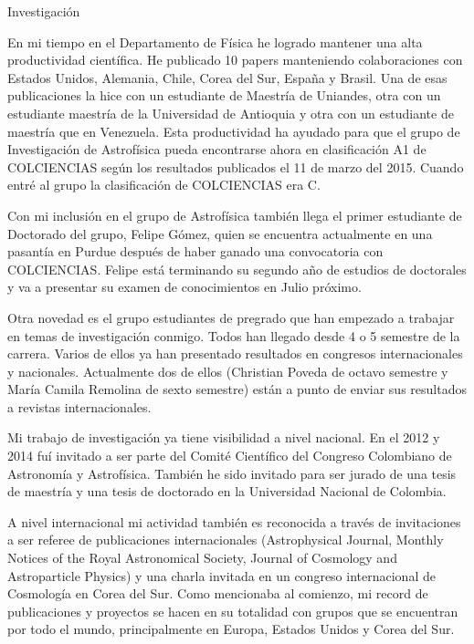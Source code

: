 Investigación

En mi tiempo en el Departamento de Física he logrado mantener una alta productividad científica. He publicado 10 papers manteniendo colaboraciones con Estados Unidos, Alemania, Chile, Corea del Sur, España y Brasil. Una de esas publicaciones la hice con un estudiante de Maestría de Uniandes, otra con un estudiante maestría de la Universidad de Antioquia y otra con un estudiante de maestría que en Venezuela. Esta productividad ha ayudado para que el grupo de Investigación de Astrofísica pueda encontrarse ahora en clasificación A1 de COLCIENCIAS según los resultados publicados el 11 de marzo del 2015. Cuando entré al grupo la clasificación de COLCIENCIAS era C. 

Con mi inclusión en el grupo de Astrofísica también llega el primer estudiante de Doctorado del grupo, Felipe Gómez, quien se encuentra actualmente en una pasantía en Purdue después de haber ganado una convocatoria con COLCIENCIAS. Felipe está terminando su segundo año de estudios de doctorales y va a presentar su examen de conocimientos en Julio próximo.

Otra novedad es el grupo estudiantes de pregrado que han empezado a trabajar en temas de investigación conmigo. Todos han llegado desde 4 o 5 semestre de la carrera. Varios de ellos ya han presentado resultados en congresos internacionales y nacionales. Actualmente dos de ellos (Christian Poveda de octavo semestre y María Camila Remolina de sexto semestre) están a punto de enviar sus resultados a revistas internacionales. 

Mi trabajo de investigación ya tiene visibilidad a nivel nacional. En el 2012 y 2014 fuí invitado a ser parte del Comité Científico del Congreso Colombiano de Astronomía y Astrofísica. También he sido invitado para ser jurado de una tesis de maestría y una tesis de doctorado en la Universidad Nacional de Colombia. 

A nivel internacional mi actividad también es reconocida a través de invitaciones a ser referee de publicaciones internacionales (Astrophysical Journal, Monthly Notices of the Royal Astronomical Society, Journal of Cosmology and Astroparticle Physics) y una charla invitada en un congreso internacional de Cosmología en Corea del Sur. Como mencionaba al comienzo, mi record de publicaciones y proyectos se hacen en su totalidad con grupos que se encuentran por todo el mundo, principalmente en Europa, Estados Unidos y Corea del Sur.


